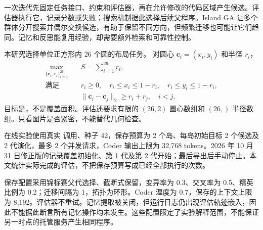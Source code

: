 一次迭代先固定任务接口、约束和评估器，再在允许修改的代码区域产生候选。评估器执行它，记录分数或失败；搜索机制据此选择后续父程序。Island GA 让多个群体分开搜索并偶尔交换候选，有助于保留不同方向，但频繁迁移也可能让它们趋同。记忆和反思能复用经验，却需要额外检索和可靠性控制。\cite{islands,memory}

本研究选择单位正方形内 26 个圆的布局任务。\cite{benchmark,circle} 对圆心 $\boldsymbol c_i=(x_i,y_i)$ 和半径 $r_i$，
\begin{align}
\max_{\{\boldsymbol c_i,r_i\}_{i=1}^{26}}\quad
&S=\sum_{i=1}^{26}r_i, \label{eq:circle-objective-zh}\\
\text{满足}\quad
&r_i\ge0,\quad r_i\le x_i\le1-r_i,\quad r_i\le y_i\le1-r_i,\\
&\|\boldsymbol c_i-\boldsymbol c_j\|_2\ge r_i+r_j,\quad i<j.
\end{align}
目标是，不是覆盖面积。评估还要求有限的 $(26,2)$ 圆心数组和 $(26,)$ 半径数组。只看图片是否紧密，不能替代几何检查。

在线实验使用真实  调用、种子 42，保存预算为 2 个岛、每岛初始目标 2 个候选及 2 代演化，最多 2 个并发请求，Coder 输出上限为 32,768 tokens。2026 年 10 月 31 日修正版的记录覆盖初始化、第 1 代及第 2 代开始；最后导出后手动停止。本文统计实际完成的评估，不把保存预算写成已经全部执行的次数。



保存配置采用锦标赛父代选择、截断式保留，变异率为 0.3、交叉率为 0.5、精英比例为 0.2；迁移间隔为 1，拓扑为环形。Coder 温度为 0.7，保存的上下文上限为 8,192。评估器不重试。记忆提取被关闭，但运行日志仍出现评估轨迹嵌入，因此不能据此断言所有记忆操作均未发生。这些配置限定了实验解释范围，不能保证另一时点的托管服务产生相同程序。
